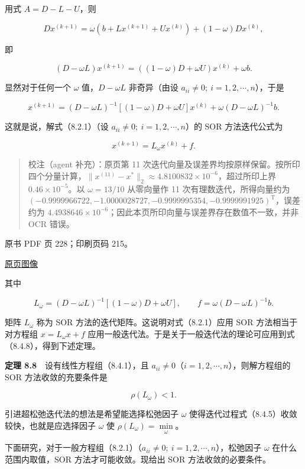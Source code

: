用式 \(A=D-L-U\)，则

\[
Dx^{(k+1)}=\omega(b+Lx^{(k+1)}+Ux^{(k)})+(1-\omega)Dx^{(k)},
\]

即

\[
(D-\omega L)x^{(k+1)}=((1-\omega)D+\omega U)x^{(k)}+\omega b.
\]

显然对于任何一个 \(\omega\) 值，\(D-\omega L\) 非奇异（由设 \(a_{ii}\neq0;\ i=1,2,\cdots,n\)），于是

\[
x^{(k+1)}=(D-\omega L)^{-1}[(1-\omega)D+\omega U]x^{(k)}+\omega(D-\omega L)^{-1}b.
\]

这就是说，解式（8.2.1）（设 \(a_{ii}\neq0;\ i=1,2,\cdots,n\)）的 SOR 方法迭代公式为

\[
x^{(k+1)}=L_\omega x^{(k)}+f.
\tag{8.4.8}
\]

\begin{quote}
校注（agent 补充）：原页第 11 次迭代向量及误差界均按原样保留。按所印四个分量计算，\(\|x^{(11)}-x^*\|_2\approx4.8100832\times10^{-6}\)，超过所印上界 \(0.46\times10^{-5}\)。以 \(\omega=13/10\) 从零向量作 11 次有理数迭代，所得向量约为 \((-0.9999966722,-1.0000028727,-0.9999995354,-0.9999991925)^{\mathrm T}\)，误差约为 \(4.4938646\times10^{-6}\)；因此本页所印向量与误差界存在数值不一致，并非 OCR 错误。
\end{quote}

\clearpage

原书 PDF 页 228；印刷页码 215。

\href{source-images/pdf-228.jpeg}{原页图像}

其中

\[
L_\omega=(D-\omega L)^{-1}[(1-\omega)D+\omega U],\qquad f=\omega(D-\omega L)^{-1}b.
\]

矩阵 \(L_\omega\) 称为 SOR 方法的迭代矩阵。这说明对式（8.2.1）应用 SOR 方法相当于对方程组 \(x=L_\omega x+f\) 应用一般迭代法。于是关于一般迭代法的理论可应用到式（8.4.8），得到下述定理。

\textbf{定理 8.8}　设有线性方程组（8.4.1），且 \(a_{ii}\neq0\)（\(i=1,2,\cdots,n\)），则解方程组的 SOR 方法收敛的充要条件是

\[
\rho(L_\omega)<1.
\]

引进超松弛迭代法的想法是希望能选择松弛因子 \(\omega\) 使得迭代过程式（8.4.5）收敛较快，也就是应选择因子 \(\omega\) 使 \(\rho(L_\omega)=\min\limits_\omega\)。

下面研究，对于一般方程组（8.2.1）（\(a_{ii}\neq0;\ i=1,2,\cdots,n\)），松弛因子 \(\omega\) 在什么范围内取值，SOR 方法才可能收敛。现给出 SOR 方法收敛的必要条件。

